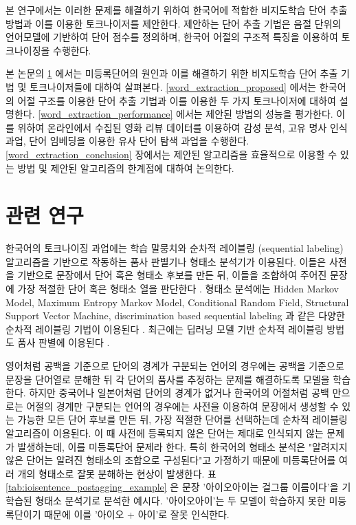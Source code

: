 \documentclass[oneside, ko,phd]{snuthesis_utf8_kor}
\begin{document}
본 연구에서는 이러한 문제를 해결하기 위하여 한국어에 적합한 비지도학습 단어 추출 방법과 이를 이용한 토크나이저를 제안한다.
제안하는 단어 추출 기법은 음절 단위의 언어모델에 기반하여 단어 점수를 정의하며, 한국어 어절의 구조적 특징을 이용하여 토크나이징을 수행한다.

본 논문의 \ref{word_extraction_related} 에서는 미등록단어의 원인과 이를 해결하기 위한 비지도학습 단어 추출 기법 및 토크나이저들에 대하여 살펴본다.
\ref{word_extraction_proposed} 에서는 한국어의 어절 구조를 이용한 단어 추출 기법과 이를 이용한 두 가지 토크나이저에 대하여 설명한다.
\ref{word_extraction_performance} 에서는 제안된 방법의 성능을 평가한다.
이를 위하여 온라인에서 수집된 영화 리뷰 데이터를 이용하여 감성 분석, 고유 명사 인식 과업, 단어 임베딩을 이용한 유사 단어 탐색 과업을 수행한다.
\ref{word_extraction_conclusion} 장에서는 제안된 알고리즘을 효율적으로 이용할 수 있는 방법 및 제안된 알고리즘의 한계점에 대하여 논의한다.

\section{관련 연구} \label{word_extraction_related}

한국어의 토크나이징 과업에는 학습 말뭉치와 순차적 레이블링 (sequential labeling) 알고리즘을 기반으로 작동하는 품사 판별기나 형태소 분석기가 이용된다. \cite{konlpy,shim2007made}
이들은 사전을 기반으로 문장에서 단어 혹은 형태소 후보를 만든 뒤, 이들을 조합하여 주어진 문장에 가장 적절한 단어 혹은 형태소 열을 판단한다 \cite{brants2000tnt}.
형태소 분석에는 Hidden Markov Model, Maximum Entropy Markov Model, Conditional Random Field, Structural Support Vector Machine, discrimination based sequential labeling 과 같은 다양한 순차적 레이블링 기법이 이용된다 \cite{krogh1994hidden, mccallum2000maximum, kudo2004applying, taskar2004max, tsochantaridis2005large, bohnet2012transition, na2012crfs}.
최근에는 딥러닝 모델 기반 순차적 레이블링 방법도 품사 판별에 이용된다 \cite{zheng2013deep, collobert2011natural}.

영어처럼 공백을 기준으로 단어의 경계가 구분되는 언어의 경우에는 공백을 기준으로 문장을 단어열로 분해한 뒤 각 단어의 품사를 추정하는 문제를 해결하도록 모델을 학습한다.
하지만 중국어나 일본어처럼 단어의 경계가 없거나 한국어의 어절처럼 공백 만으로는 어절의 경계만 구분되는 언어의 경우에는 사전을 이용하여 문장에서 생성할 수 있는 가능한 모든 단어 후보를 만든 뒤, 가장 적절한 단어를 선택하는데 순차적 레이블링 알고리즘이 이용된다.
이 때 사전에 등록되지 않은 단어는 제대로 인식되지 않는 문제가 발생하는데, 이를 미등록단어 문제라 한다.
특히 한국어의 형태소 분석은 "알려지지 않은 단어는 알려진 형태소의 조합으로 구성된다"고 가정하기 때문에 미등록단어를 여러 개의 형태소로 잘못 분해하는 현상이 발생한다.
표 \ref{tab:ioisentence_postagging_example} 은 문장 '아이오아이는 걸그룹 이름이다'을 기학습된 형태소 분석기로 분석한 예시다.
'아이오아이'는 두 모델이 학습하지 못한 미등록단이기 때문에 이를 '아이오 + 아이'로 잘못 인식한다.
\end{document}
